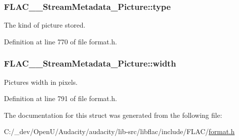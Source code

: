 \subsubsection[{\texorpdfstring{type}{type}}]{ F\+L\+A\+C\+\_\+\+\_\+\+Stream\+Metadata\+\_\+\+Picture\+::type}\hypertarget{struct_f_l_a_c_____stream_metadata___picture_addc05a87a1da1ec7dd2301944ff2819c}{}\label{struct_f_l_a_c_____stream_metadata___picture_addc05a87a1da1ec7dd2301944ff2819c}
The kind of picture stored. 

Definition at line 770 of file format.\+h.

\subsubsection[{\texorpdfstring{width}{width}}]{ F\+L\+A\+C\+\_\+\+\_\+\+Stream\+Metadata\+\_\+\+Picture\+::width}\hypertarget{struct_f_l_a_c_____stream_metadata___picture_a18dc6cdef9fa6c815450671f631a1e04}{}\label{struct_f_l_a_c_____stream_metadata___picture_a18dc6cdef9fa6c815450671f631a1e04}
Picture\textquotesingle{}s width in pixels. 

Definition at line 791 of file format.\+h.



The documentation for this struct was generated from the following file\+:\begin{DoxyCompactItemize}
\item 
C\+:/\+\_\+dev/\+Open\+U/\+Audacity/audacity/lib-\/src/libflac/include/\+F\+L\+A\+C/\hyperlink{include_2_f_l_a_c_2format_8h}{format.\+h}\end{DoxyCompactItemize}
